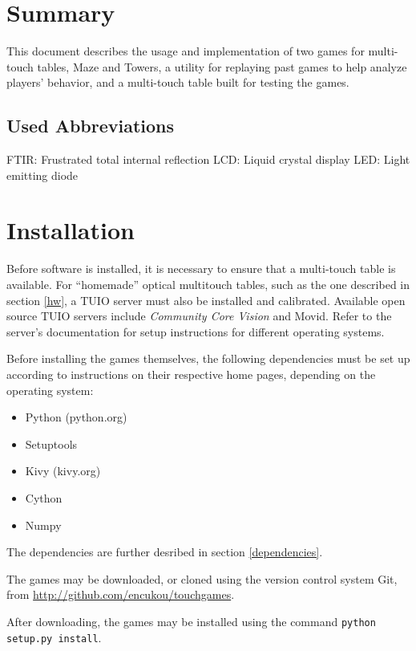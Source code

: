 \documentclass[a4paper,12pt]{article}
\begin{document}
\section{Summary}

This document describes the usage and implementation of two games for
multi-touch tables, Maze and Towers, a utility for replaying past games to
help analyze players' behavior, and a multi-touch table built for testing the
games.

\subsection{Used Abbreviations}

FTIR: Frustrated total internal reflection
LCD: Liquid crystal display
LED: Light emitting diode

\section{Installation}

Before software is installed, it is necessary to ensure that a multi-touch
table is available.
For “homemade” optical multitouch tables, such as the one described in
section \ref{hw}, a TUIO server must also be installed and calibrated.
Available open source TUIO servers include \emph{Community Core Vision} and
Movid.
Refer to the server's documentation for setup instructions for different
operating systems.

Before installing the games themselves, the following dependencies must be
set up according to instructions on their respective home pages, depending
on the operating system:

\begin{itemize}
\item Python (python.org)
\item Setuptools %
\item Kivy (kivy.org)
\item Cython %
\item Numpy %
\end{itemize}

The dependencies are further desribed in section \ref{dependencies}.

The games may be downloaded, or cloned using the version control system Git,
from \url{http://github.com/encukou/touchgames}.

After downloading, the games may be installed using the command
\texttt{python setup.py install}.
\end{document}
